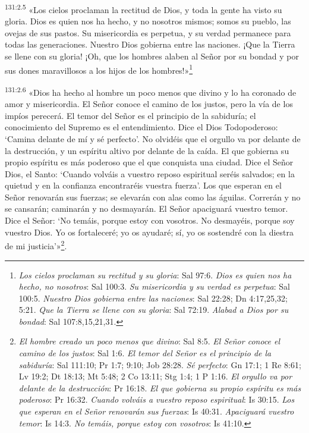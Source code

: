 \par
\textsuperscript{131:2.5} «Los cielos proclaman la rectitud de Dios, y toda la gente ha visto su gloria. Dios es quien nos ha hecho, y no nosotros mismos; somos su pueblo, las ovejas de sus pastos. Su misericordia es perpetua, y su verdad permanece para todas las generaciones. Nuestro Dios gobierna entre las naciones. ¡Que la Tierra se llene con su gloria! ¡Oh, que los hombres alaben al Señor por su bondad y por sus dones maravillosos a los hijos de los hombres!»\footnote{\textit{Los cielos proclaman su rectitud y su gloria}: Sal 97:6. \textit{Dios es quien nos ha hecho, no nosotros}: Sal 100:3. \textit{Su misericordia y su verdad es perpetua}: Sal 100:5. \textit{Nuestro Dios gobierna entre las naciones}: Sal 22:28; Dn 4:17,25,32; 5:21. \textit{Que la Tierra se llene con su gloria}: Sal 72:19. \textit{Alabad a Dios por su bondad}: Sal 107:8,15,21,31.}

\par
\textsuperscript{131:2.6} «Dios ha hecho al hombre un poco menos que divino y lo ha coronado de amor y misericordia. El Señor conoce el camino de los justos, pero la vía de los impíos perecerá. El temor del Señor es el principio de la sabiduría; el conocimiento del Supremo es el entendimiento. Dice el Dios Todopoderoso: `Camina delante de mí y sé perfecto'. No olvidéis que el orgullo va por delante de la destrucción, y un espíritu altivo por delante de la caída. El que gobierna su propio espíritu es más poderoso que el que conquista una ciudad. Dice el Señor Dios, el Santo: `Cuando volváis a vuestro reposo espiritual seréis salvados; en la quietud y en la confianza encontraréis vuestra fuerza'. Los que esperan en el Señor renovarán sus fuerzas; se elevarán con alas como las águilas. Correrán y no se cansarán; caminarán y no desmayarán. El Señor apaciguará vuestro temor. Dice el Señor: `No temáis, porque estoy con vosotros. No desmayéis, porque soy vuestro Dios. Yo os fortaleceré; yo os ayudaré; sí, yo os sostendré con la diestra de mi justicia'»\footnote{\textit{El hombre creado un poco menos que divino}: Sal 8:5. \textit{El Señor conoce el camino de los justos}: Sal 1:6. \textit{El temor del Señor es el principio de la sabiduría}: Sal 111:10; Pr 1:7; 9:10; Job 28:28. \textit{Sé perfecto}: Gn 17:1; 1 Re 8:61; Lv 19:2; Dt 18:13; Mt 5:48; 2 Co 13:11; Stg 1:4; 1 P 1:16. \textit{El orgullo va por delante de la destrucción}: Pr 16:18. \textit{El que gobierna su propio espíritu es más poderoso}: Pr 16:32. \textit{Cuando volváis a vuestro reposo espiritual}: Is 30:15. \textit{Los que esperan en el Señor renovarán sus fuerzas}: Is 40:31. \textit{Apaciguará vuestro temor}: Is 14:3. \textit{No temáis, porque estoy con vosotros}: Is 41:10.}.

